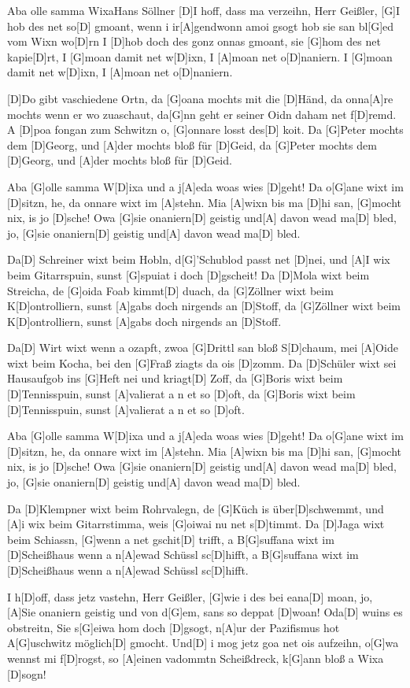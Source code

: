 \documentclass[../main.tex]{subfiles}
\begin{document}
\begin{song}[3]{Aba olle samma Wixa}{Hans Söllner}{}        
[D]I hoff, dass ma verzeihn, Herr Geißler, [G]I hob des net so[D] gmoant,
wenn i ir[A]gendwonn amoi gsogt hob sie san bl[G]ed vom Wixn wo[D]rn
I [D]hob doch des gonz onnas gmoant, sie [G]hom des net kapie[D]rt,
I [G]moan damit net w[D]ixn, I [A]moan net o[D]naniern.
I [G]moan damit net w[D]ixn, I [A]moan net o[D]naniern.

[D]Do gibt vaschiedene Ortn, da [G]oana mochts mit die [D]Händ,
da onna[A]re mochts wenn er wo zuaschaut, da[G]nn geht er seiner Oidn daham net f[D]remd.
A [D]poa fongan zum Schwitzn o, [G]onnare losst des[D] koit.
Da [G]Peter mochts dem [D]Georg, und [A]der mochts bloß für [D]Geid,
da [G]Peter mochts dem [D]Georg, und [A]der mochts bloß für [D]Geid.

Aba [G]olle samma W[D]ixa und a j[A]eda woas wies [D]geht!
Da o[G]ane wixt im [D]sitzn, he, da onnare wixt im [A]stehn.
Mia [A]wixn bis ma [D]hi san, [G]mocht nix, is jo [D]sche!
Owa [G]sie onaniern[D] geistig und[A] davon wead ma[D] bled,
jo, [G]sie onaniern[D] geistig und[A] davon wead ma[D] bled.

Da[D] Schreiner wixt beim Hobln, d[G]'Schublod passt net [D]nei,
und [A]I wix beim Gitarrspuin, sunst [G]spuiat i doch [D]gscheit!
Da [D]Mola wixt beim Streicha, de [G]oida Foab kimmt[D] duach,
da [G]Zöllner wixt beim K[D]ontrolliern, sunst [A]gabs doch nirgends an [D]Stoff,
da [G]Zöllner wixt beim K[D]ontrolliern, sunst [A]gabs doch nirgends an [D]Stoff.

Da[D] Wirt wixt wenn a ozapft, zwoa [G]Drittl san bloß S[D]chaum,
mei [A]Oide wixt beim Kocha, bei den [G]Fraß ziagts da ois [D]zomm.
Da [D]Schüler wixt sei Hausaufgob ins [G]Heft nei und kriagt[D] Zoff,
da [G]Boris wixt beim [D]Tennisspuin, sunst [A]valierat a n et so [D]oft,
da [G]Boris wixt beim [D]Tennisspuin, sunst [A]valierat a n et so [D]oft.

Aba [G]olle samma W[D]ixa und a j[A]eda woas wies [D]geht!
Da o[G]ane wixt im [D]sitzn, he, da onnare wixt im [A]stehn.
Mia [A]wixn bis ma [D]hi san, [G]mocht nix, is jo [D]sche!
Owa [G]sie onaniern[D] geistig und[A] davon wead ma[D] bled,
jo, [G]sie onaniern[D] geistig und[A] davon wead ma[D] bled.

\newpage
Da [D]Klempner wixt beim Rohrvalegn, de [G]Küch is über[D]schwemmt,
und [A]i wix beim Gitarrstimma, weis [G]oiwai nu net s[D]timmt.
Da [D]Jaga wixt beim Schiassn, [G]wenn a net gschit[D] trifft,
a B[G]suffana wixt im [D]Scheißhaus wenn a n[A]ewad Schüssl sc[D]hifft,
a B[G]suffana wixt im [D]Scheißhaus wenn a n[A]ewad Schüssl sc[D]hifft.

I h[D]off, dass jetz vastehn, Herr Geißler, [G]wie i des bei eana[D] moan,
jo, [A]Sie onaniern geistig und von d[G]em, sans so deppat [D]woan!
Oda[D] wuins es obstreitn, Sie s[G]eiwa hom doch [D]gsogt,
n[A]ur der Pazifismus hot A[G]uschwitz möglich[D] gmocht.
Und[D] i mog jetz goa net ois aufzeihn, o[G]wa wennst mi f[D]rogst,
so [A]einen vadommtn Scheißdreck, k[G]ann bloß a Wixa [D]sogn!
\end{song}
\end{document}
